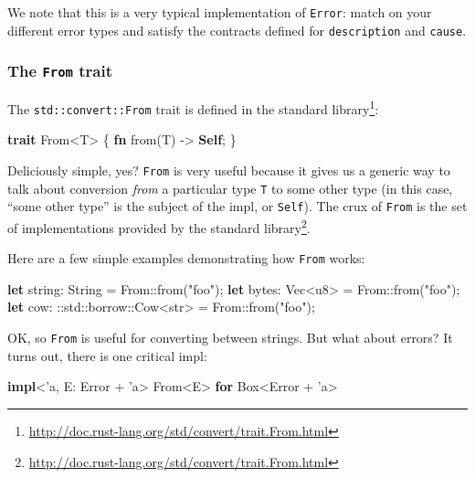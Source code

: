 \documentclass[a4paper,]{book}
\renewcommand*{\hypertarget}[3][\ar]{%
  \def\ar{#2}%
  \label{#1}%
  #3}
\newenvironment{Shaded}{\begin{snugshade}}{\end{snugshade}}
\newcommand{\KeywordTok}[1]{\textcolor[rgb]{0.13,0.29,0.53}{\textbf{{#1}}}}
\newcommand{\DataTypeTok}[1]{\textcolor[rgb]{0.13,0.29,0.53}{{#1}}}
\newcommand{\StringTok}[1]{\textcolor[rgb]{0.31,0.60,0.02}{{#1}}}
\newcommand{\OtherTok}[1]{\textcolor[rgb]{0.56,0.35,0.01}{{#1}}}
\newcommand{\NormalTok}[1]{{#1}}
\renewcommand{\href}[2]{#2\footnote{\url{#1}}}
\begin{document}
We note that this is a very typical implementation of \texttt{Error}:
match on your different error types and satisfy the contracts defined
for \texttt{description} and \texttt{cause}.

\hypertarget{the-from-trait}{\subsubsection{\texorpdfstring{The
\texttt{From} trait}{The From trait}}\label{the-from-trait}}

The \texttt{std::convert::From} trait is
\href{http://doc.rust-lang.org/std/convert/trait.From.html}{defined in
the standard library}:

\protect\hypertarget{code-from-def}{}{}

\begin{Shaded}
\begin{Highlighting}[]
\KeywordTok{trait} \NormalTok{From<T> \{}
    \KeywordTok{fn} \NormalTok{from(T) -> }\KeywordTok{Self}\NormalTok{;}
\NormalTok{\}}
\end{Highlighting}
\end{Shaded}

Deliciously simple, yes? \texttt{From} is very useful because it gives
us a generic way to talk about conversion \emph{from} a particular type
\texttt{T} to some other type (in this case, ``some other type'' is the
subject of the impl, or \texttt{Self}). The crux of \texttt{From} is the
\href{http://doc.rust-lang.org/std/convert/trait.From.html}{set of
implementations provided by the standard library}.

Here are a few simple examples demonstrating how \texttt{From} works:

\begin{Shaded}
\begin{Highlighting}[]
\KeywordTok{let} \NormalTok{string: }\DataTypeTok{String} \NormalTok{= From::from(}\StringTok{"foo"}\NormalTok{);}
\KeywordTok{let} \NormalTok{bytes: }\DataTypeTok{Vec}\NormalTok{<}\DataTypeTok{u8}\NormalTok{> = From::from(}\StringTok{"foo"}\NormalTok{);}
\KeywordTok{let} \NormalTok{cow: ::std::borrow::Cow<}\DataTypeTok{str}\NormalTok{> = From::from(}\StringTok{"foo"}\NormalTok{);}
\end{Highlighting}
\end{Shaded}

OK, so \texttt{From} is useful for converting between strings. But what
about errors? It turns out, there is one critical impl:

\begin{Shaded}
\begin{Highlighting}[]
\KeywordTok{impl}\NormalTok{<}\OtherTok{'a}\NormalTok{, E: Error + }\OtherTok{'a}\NormalTok{> From<E> }\KeywordTok{for} \DataTypeTok{Box}\NormalTok{<Error + }\OtherTok{'a}\NormalTok{>}
\end{Highlighting}
\end{Shaded}
\end{document}
